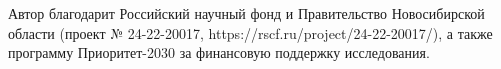\documentclass[a4paper,14pt]{extarticle}
\begin{document}

\setcounter{page}{2}
\tableofcontents






Автор благодарит Российский научный фонд и Правительство Новосибирской области (проект № 24-22-20017, https://rscf.ru/project/24-22-20017/), а также программу Приоритет-2030 за финансовую поддержку исследования.

\printbibliography{}

\end{document}
